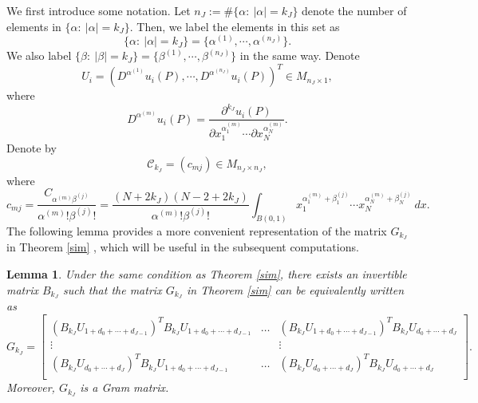 \documentclass[11pt,reqno]{article}
\newtheorem{lemma}[teo]{Lemma}
\numberwithin{equation}{section}
\begin{document}
     We first introduce some notation.
     Let  $n_J:=\#\{\alpha:\ |\alpha|=k_J\}$ denote the number of elements in $\{\alpha:\ |\alpha|=k_J\}$. Then, we label the elements in this set as 
    $$
    \{\alpha:\ |\alpha|=k_J\}=\{\alpha^{(1)},\cdots,\alpha^{(n_J)}\}.
    $$
    We also label $\{\beta:\ |\beta|=k_J\}=\{\beta^{(1)},\cdots,\beta^{(n_J)}\}$ in the same way.
    Denote 
    \begin{equation}\label{defU}
         U_i=\left(D^{\alpha^{(1)}}u_i(P),\cdots,D^{\alpha^{(n_J)}}u_i(P)\right)^T\in M_{n_J\times 1},
    \end{equation}
    where 
    \begin{equation*}
        D^{\alpha^{(m)}}u_i(P)=\frac{\partial^{k_J} u_i (P)}{\partial x_{1}^{\alpha_1^{(m)}}\cdots\partial x_{N}^{\alpha_N^{(m)}}}.
    \end{equation*}
    Denote by
    \begin{equation}
         \mathcal{C}_{k_J}=\left(c_{mj}\right)\in M_{n_J\times n_J},
    \end{equation}
	where
    $$
    c_{mj}=\frac{C_{\alpha^{(m)}\beta^{(j)}}}{\alpha^{(m)}!\beta^{(j)}!}=\frac{(N+2k_J)(N-2+2k_J)}{\alpha^{(m)}!\beta^{(j)}!}\int_{ B(0,1)} x_{1}^{\alpha_1^{(m)}+\beta_1^{(j)}}\cdots x_{N}^{\alpha_N^{(m)}+\beta_N^{(j)}} \ d x.
    $$
    The following lemma provides a more convenient representation of the matrix $G_{k_J}$ in Theorem \ref{sim} , which will be useful in the subsequent computations.
    \begin{lemma}\label{defG}
        Under the same condition as Theorem \ref{sim}, there exists an invertible matrix $B_{k_J}$ such that the matrix $G_{k_J}$ in Theorem \ref{sim} can be equivalently written as
        $$
G_{k_J}=
\begin{bmatrix}
    \left(B_{k_J}U_{1+d_0+\cdots+d_{J-1}}\right)^TB_{k_J}U_{1+d_0+\cdots+d_{J-1}} &\dots & \left(B_{k_J}U_{1+d_0+\cdots+d_{J-1}}\right)^TB_{k_J}U_{d_0+\cdots+d_{J}}\\
    \vdots&  &\vdots\\
     \left(B_{k_J}U_{d_0+\cdots+d_{J}}\right)^TB_{k_J}U_{1+d_0+\cdots+d_{J-1}} &\dots & \left(B_{k_J}U_{d_0+\cdots+d_{J}}\right)^TB_{k_J}U_{d_0+\cdots+d_{J}}\\
\end{bmatrix}.
$$
Moreover, $G_{k_J}$ is a Gram matrix.
    \end{lemma}
\end{document}
